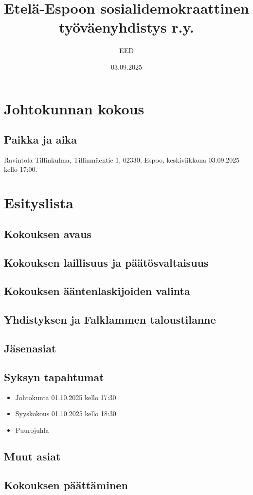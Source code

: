\documentclass[a4paper,12pt]{article}
\title{Etelä-Espoon sosialidemokraattinen työväenyhdistys r.y.}
\author{EED}
\date{03.09.2025}
\begin{document}
\maketitle
\tableofcontents
\section*{Johtokunnan kokous}
\subsection*{Paikka ja aika}
Ravintola Tillinkulma, Tillinmäentie 1, 02330, Espoo, keskiviikkona 03.09.2025 kello 17:00.
\section*{Esityslista}
\subsection{Kokouksen avaus}
\subsection{Kokouksen laillisuus ja päätösvaltaisuus}
\subsection{Kokouksen ääntenlaskijoiden valinta}
\subsection{Yhdistyksen ja Falklammen taloustilanne}
\subsection{Jäsenasiat}
\subsection{Syksyn tapahtumat}
\begin{itemize}
\item{Johtokunta 01.10.2025 kello 17:30}
\item{Syyskokous 01.10.2025 kello 18:30}
\item{Puurojuhla}
\end{itemize}
\subsection{Muut asiat}
\subsection{Kokouksen päättäminen}
\end{document}
